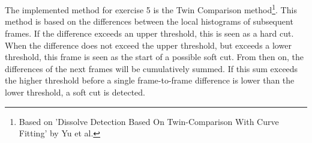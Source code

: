\section[Pseudo-code and explanatory notes for the video shot detection method implemented
in Exercise 5.]{}\label{Q1}
The implemented method for exercise 5 is the Twin Comparison method\footnote{Based on 'Dissolve Detection Based On Twin-Comparison With Curve Fitting' by Yu et al.}. This method is based on the differences between the local histograms of subsequent frames. If the difference exceeds an upper threshold, this is seen as a hard cut. When the difference does not exceed the upper threshold, but exceeds a lower threshold, this frame is seen as the start of a possible soft cut. From then on, the differences of the next frames will be cumulatively summed. If this sum exceeds the higher threshold before a single frame-to-frame difference is lower than the lower threshold, a soft cut is detected.
\vspace{1em}
